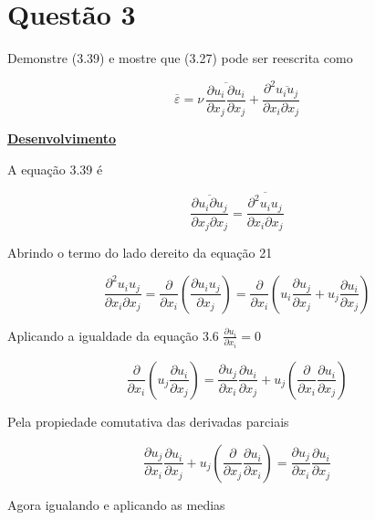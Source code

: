 \documentclass[12pt]{article}
\begin{document}
\section*{Questão 3}
Demonstre (3.39) e mostre que (3.27) pode ser reescrita como 

\begin{equation}
	\overline{\varepsilon} = \nu \, \overline{ 
		\frac{\partial u_i}{\partial x_j} \frac{\partial u_i}{\partial x_j} } 
	+ \frac{\partial^2 \overline{u_i u_j}}{\partial x_i \partial x_j}
\end{equation}


\textbf{\underline{Desenvolvimento}}

A equação 3.39 é

\begin{equation}
	\frac{\overline{\partial u_i \partial u_j}}{\partial x_j \partial x_j} = \frac{\overline{\partial ^2 u_i u_j}}{\partial x_i \partial x_j}
\end{equation}

Abrindo o termo do lado dereito da equação 21

\begin{equation}
	\frac{\partial ^2 u_i u_j}{\partial x_i \partial x_j} = \frac{\partial}{\partial x_i} \left( \frac{\partial u_i u_j}{\partial x_j}\right) = \frac{\partial}{\partial x_i} \left ( u_i  \frac{\partial u_j}{\partial x_j} + u_j  \frac{\partial u_i}{\partial x_j} \right)
\end{equation}

Aplicando a igualdade da equação 3.6 $\frac{\partial u_i}{\partial x_i} = 0$

\begin{equation}
	\frac{\partial}{\partial x_i} \left (u_j  \frac{\partial u_i}{\partial x_j} \right) = \frac{\partial u_j }{\partial x_i}  \frac{\partial u_i}{\partial x_j} + u_j   \left ( \frac{\partial}{\partial x_i} \frac{\partial u_i}{\partial x_j} \right)
\end{equation}

Pela propiedade comutativa das derivadas parciais

\begin{equation}
	\frac{\partial u_j }{\partial x_i}  \frac{\partial u_i}{\partial x_j} + u_j   \left ( \frac{\partial}{\partial x_j} \frac{\partial u_i}{\partial x_i} \right) = \frac{\partial u_j }{\partial x_i}  \frac{\partial u_i}{\partial x_j}
\end{equation}

Agora igualando e aplicando as medias
\end{document}
